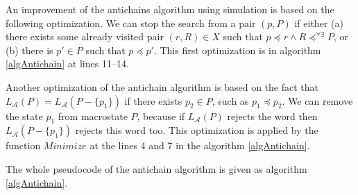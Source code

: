 An improvement of the antichains algorithm using simulation \cite{tacas10} is based on the following optimization. 
We can stop the search from a pair $(p,P)$ if either (a) there exists some already visited pair $(r,R) \in X$ 
such that $p\preceq r \wedge R\preceq^{\forall\exists}P$, 
or (b) there is $p' \in P$ such that $p \preceq p'$. This first
optimization is in algorithm \ref{algAntichain} at lines 11--14.

Another optimization \cite{tacas10} of the antichain algorithm is based on the fact 
that $L_\mathcal{A}(P)=L_\mathcal{A}(P-\{p_1\})$ if there exists $p_2 \in P$, such as $p_1 \preceq p_2$. We can remove the state $p_1$ 
from macrostate $P$, because if $L_\mathcal{A}(P)$ rejects the word 
then $L_\mathcal{A}(P-\{p_1\})$ rejects this word too. This optimization is applied by the function $Minimize$ at
the lines 4 and 7 in the algorithm \ref{algAntichain}.

The whole pseudocode of the antichain algorithm is given as algorithm \ref{algAntichain}.

